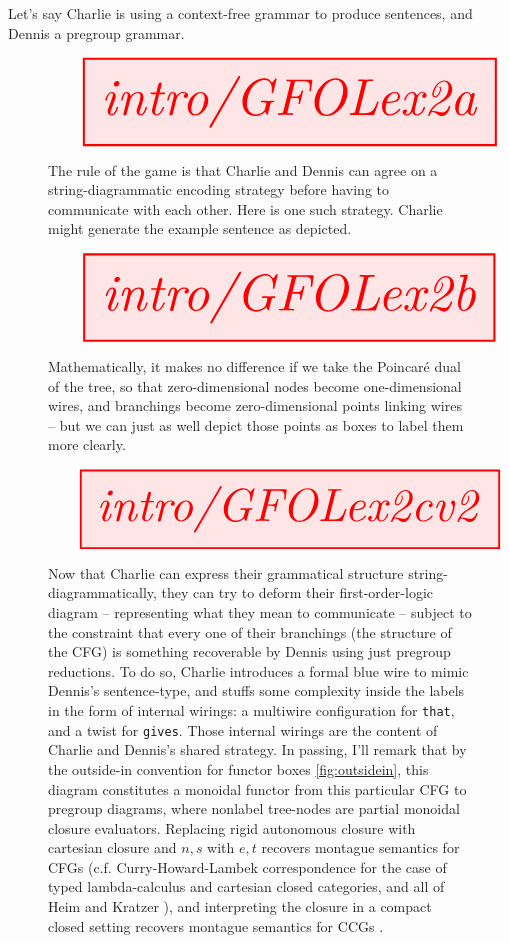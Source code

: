 \begin{example} Let's say Charlie is using a context-free grammar to produce sentences, and Dennis a pregroup grammar. \\

\begin{figure}[h!]\label{fig:GFOLex2a}
\centering
\[\resizebox{\textwidth}{!}{\tikzfig{intro/GFOLex2a}}\]
\caption{The rule of the game is that Charlie and Dennis can agree on a string-diagrammatic encoding strategy before having to communicate with each other. Here is one such strategy. Charlie might generate the example sentence as depicted.}
\end{figure}

\begin{figure}[h!]\label{fig:GFOLex2b}
\centering
\[\resizebox{\textwidth}{!}{\tikzfig{intro/GFOLex2b}}\]
\caption{Mathematically, it makes no difference if we take the Poincar\'{e} dual of the tree, so that zero-dimensional nodes become one-dimensional wires, and branchings become zero-dimensional points linking wires -- but we can just as well depict those points as boxes to label them more clearly.}
\end{figure}

\begin{figure}[h!]\label{fig:GFOLex2c}
\centering
\[\resizebox{\textwidth}{!}{\tikzfig{intro/GFOLex2cv2}}\]
\caption{Now that Charlie can express their grammatical structure string-diagrammatically, they can try to deform their first-order-logic diagram -- representing what they mean to communicate -- subject to the constraint that every one of their branchings (the structure of the CFG) is something recoverable by Dennis using just pregroup reductions. To do so, Charlie introduces a formal blue wire to mimic Dennis's sentence-type, and stuffs some complexity inside the labels in the form of internal wirings: a multiwire configuration for \texttt{that}, and a twist for \texttt{gives}. Those internal wirings are the content of Charlie and Dennis's shared strategy. In passing, I'll remark that by the outside-in convention for functor boxes \ref{fig:outsidein}, this diagram constitutes a monoidal functor from this particular CFG to pregroup diagrams, where nonlabel tree-nodes are partial monoidal closure evaluators. Replacing rigid autonomous closure with cartesian closure and $n,s$ with $e,t$ recovers montague semantics for CFGs (c.f. Curry-Howard-Lambek correspondence for the case of typed lambda-calculus and cartesian closed categories, and all of Heim and Kratzer \citep{heimSemanticsGenerativeGrammar1998b}), and interpreting the closure in a compact closed setting recovers montague semantics for CCGs \citep{yeungCCGBasedVersionDisCoCat2021b}.}
\end{figure}


\end{example}
